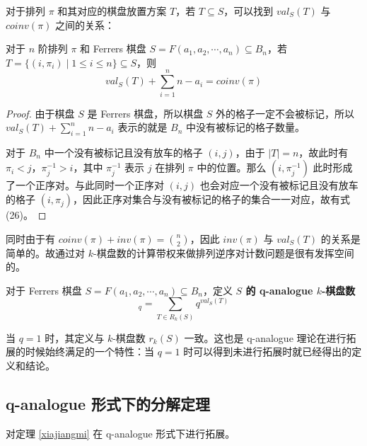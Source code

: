 \documentclass{noithesis}
\begin{document}
	对于排列 $\pi$ 和其对应的棋盘放置方案 $T$，若 $T \subseteq S$，可以找到 $val_S(T)$ 与 $coinv(\pi)$ 之间的关系：
	\begin{theorem}\label{val=coinv}
		对于 $n$ 阶排列 $\pi$ 和 Ferrers 棋盘 $S = F(a_1,a_2,\cdots,a_n) \subseteq B_n$，若 $T = \{(i,\pi_i) \mid 1 \leq i \leq n\} \subseteq S$，则\begin{equation}
		val_S(T) + \sum_{i=1}^n n-a_i = coinv(\pi)
		\end{equation}
	\end{theorem}
	\begin{proof}
		由于棋盘 $S$ 是 Ferrers 棋盘，所以棋盘 $S$ 外的格子一定不会被标记，所以 $val_S(T) + \sum_{i=1}^n n-a_i$ 表示的就是 $B_n$ 中没有被标记的格子数量。
		
		对于 $B_n$ 中一个没有被标记且没有放车的格子 $(i,j)$，由于 $|T| = n$，故此时有 $\pi_i < j$，$\pi^{-1}_j > i$，其中 $\pi^{-1}_j$ 表示 $j$ 在排列 $\pi$ 中的位置。那么 $(i,\pi^{-1}_j)$ 此时形成了一个正序对。与此同时一个正序对 $(i,j)$ 也会对应一个没有被标记且没有放车的格子 $(i,\pi_j)$，因此正序对集合与没有被标记的格子的集合一一对应，故有式 (26)。
	\end{proof}

	同时由于有 $coinv(\pi) + inv(\pi) = \binom{n}{2}$，因此 $inv(\pi)$ 与 $val_S(T)$ 的关系是简单的。故通过对 $k$-棋盘数的计算带权来做排列逆序对计数问题是很有发挥空间的。
	
	\begin{definition}
		对于 Ferrers 棋盘 $S = F(a_1,a_2,\cdots,a_n) \subseteq B_n$，定义 \textbf{$S$ 的 q-analogue $k$-棋盘数} \begin{equation}
			[r_k(S)]_q = \sum_{T \in R_k(S)} q^{val_S(T)}
		\end{equation}
	\end{definition}
	
	当 $q=1$ 时，其定义与 $k$-棋盘数 $r_{k}(S)$ 一致。这也是 q-analogue 理论在进行拓展的时候始终满足的一个特性：当 $q=1$ 时可以得到未进行拓展时就已经得出的定义和结论。
	
	\subsection{q-analogue 形式下的分解定理}
	
	对定理 \ref{xiajiangmi} 在 q-analogue 形式下进行拓展。
	
\end{document}
